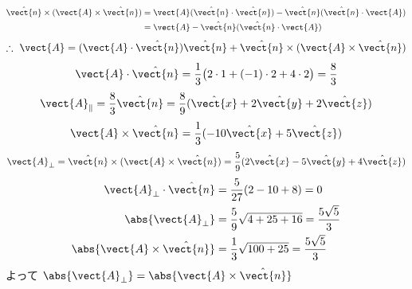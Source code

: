 \begin{align*}
\hat{\vect{n}}\times(\vect{A}\times\hat{\vect{n}})&=\vect{A}(\hat{\vect{n}}\cdot\hat{\vect{n}})-\hat{\vect{n}}(\hat{\vect{n}}\cdot\vect{A})\\
&=\vect{A}-\hat{\vect{n}}(\hat{\vect{n}}\cdot\vect{A})
\end{align*}
\[ \therefore\ \vect{A}=(\vect{A}\cdot\hat{\vect{n}})\hat{\vect{n}}+\hat{\vect{n}}\times(\vect{A}\times\hat{\vect{n}}) \]
\[ \vect{A}\cdot\hat{\vect{n}}=\frac{1}{3}\bigl(2\cdot1+(-1)\cdot2+4\cdot2\bigr)=\frac{8}{3} \]
\[ \vect{A}_{\parallel}=\frac{8}{3}\hat{\vect{n}}=\frac{8}{9}(\hat{\vect{x}}+2\hat{\vect{y}}+2\hat{\vect{z}}) \]
\[ \vect{A}\times\hat{\vect{n}}=\frac{1}{3}(-10\hat{\vect{x}}+5\hat{\vect{z}}) \]
\[ \vect{A}_{\perp}=\hat{\vect{n}}\times(\vect{A}\times\hat{\vect{n}})=\frac{5}{9}(2\hat{\vect{x}}-5\hat{\vect{y}}+4\hat{\vect{z}}) \]
\begin{align*}
\vect{A}_{\perp}\cdot\hat{\vect{n}}&=\frac{5}{27}(2-10+8)=0\\
\abs{\vect{A}_{\perp}}&=\frac{5}{9}\sqrt{4+25+16}=\frac{5\sqrt{5}}{3}\\
\abs{\vect{A}\times\hat{\vect{n}}}&=\frac{1}{3}\sqrt{100+25}=\frac{5\sqrt{5}}{3}
\end{align*}
よって $\abs{\vect{A}_{\perp}}=\abs{\vect{A}\times\hat{\vect{n}}}$
